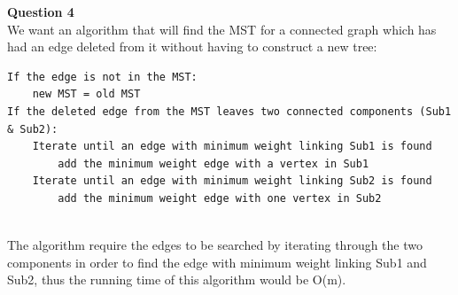 \documentclass{article}
\begin{document}
\bigskip
{\bf Question 4}\\
We want an algorithm that will find the MST for a connected graph which has had an edge deleted from it without having to construct a new tree:
\begin{lstlisting}
If the edge is not in the MST:
    new MST = old MST
If the deleted edge from the MST leaves two connected components (Sub1 & Sub2):
    Iterate until an edge with minimum weight linking Sub1 is found
        add the minimum weight edge with a vertex in Sub1
    Iterate until an edge with minimum weight linking Sub2 is found
        add the minimum weight edge with one vertex in Sub2
    
\end{lstlisting}
The algorithm require the edges to be searched by iterating through the two components in order to find the edge with minimum weight linking Sub1 and Sub2, thus the running time of this algorithm would be O(m).
\end{document}
